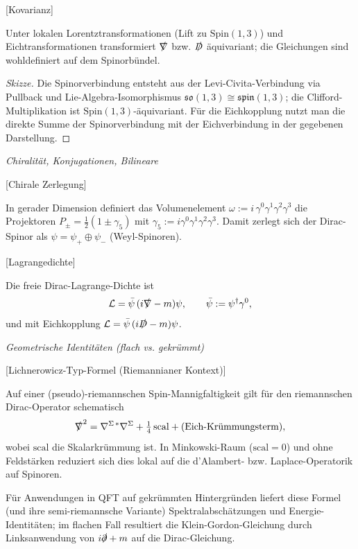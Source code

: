 \documentclass[10pt, letterpaper]{article}
\newcommand{\Spin}{\mathrm{Spin}}
\begin{document}
[Kovarianz]

Unter lokalen Lorentztransformationen (Lift zu \(\Spin(1,3)\)) und Eichtransformationen transformiert \(\slashed{\nabla}\) bzw. \(\slashed{D}\) äquivariant; die Gleichungen sind wohldefiniert auf dem Spinorbündel.


\begin{proof}[Skizze]
Die Spinorverbindung entsteht aus der Levi-Civita-Verbindung via Pullback und Lie-Algebra-Isomorphismus \(\mathfrak{so}(1,3)\cong\mathfrak{spin}(1,3)\); die Clifford-Multiplikation ist \(\Spin(1,3)\)-äquivariant. Für die Eichkopplung nutzt man die direkte Summe der Spinorverbindung mit der Eichverbindung in der gegebenen Darstellung.
\end{proof}

\emph{Chiralität, Konjugationen, Bilineare}



[Chirale Zerlegung]

In gerader Dimension definiert das Volumenelement \(\omega:= i\,\gamma^0\gamma^1\gamma^2\gamma^3\) die Projektoren 
\(P_\pm=\tfrac{1}{2}(1\pm\gamma_5)\) mit \(\gamma_5:=i\gamma^0\gamma^1\gamma^2\gamma^3\). 
Damit zerlegt sich der Dirac-Spinor als \(\psi=\psi_+\oplus\psi_-\) (Weyl-Spinoren).




[Lagrangedichte]

Die freie Dirac-Lagrange-Dichte ist
\[
\mathcal{L}=\bar\psi\,(i\slashed{\nabla}-m)\psi,\qquad 
\bar\psi:=\psi^\dagger \gamma^0,
\]
und mit Eichkopplung \(\mathcal{L}=\bar\psi\,(i\slashed{D}-m)\psi\).




\emph{Geometrische Identitäten (flach vs. gekrümmt)}



[Lichnerowicz-Typ-Formel (Riemannianer Kontext)]

Auf einer (pseudo)-riemannschen Spin-Mannigfaltigkeit gilt für den riemannschen Dirac-Operator schematisch 
\[
\slashed{\nabla}^2 = \nabla^{\Sigma\,*}\nabla^\Sigma + \tfrac{1}{4}\,\mathrm{scal} + \text{(Eich-Krümmungsterm)},
\]
wobei \(\mathrm{scal}\) die Skalar­krümmung ist. In Minkowski-Raum (\(\mathrm{scal}=0\)) und ohne Feldstärken reduziert sich dies lokal auf die d’Alambert- bzw. Laplace-Operatorik auf Spinoren.




Für Anwendungen in QFT auf gekrümmten Hintergründen liefert diese Formel (und ihre semi-riemannsche Variante) Spektralabschätzungen und Energie-Identitäten; im flachen Fall resultiert die Klein-Gordon-Gleichung durch Linksanwendung von \(i\slashed{\partial}+m\) auf die Dirac-Gleichung.
\end{document}
